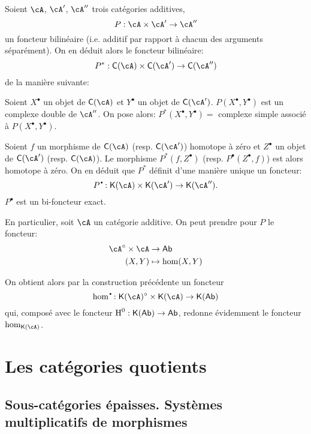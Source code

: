 Soient $\cA$, $\cA'$, $\cA''$ trois cat\'egories additives, 
\[
  P:\cA\times \cA'\to \cA''
\]
un foncteur bilin\'eaire (i.e. additif par rapport \`a chacun des arguments 
s\'epar\'ement). On en d\'eduit alors le foncteur bilin\'eaire: 
\[
  P^\ast:\eC(\cA)\times \eC(\cA') \to \eC(\cA'') 
\]
de la mani\`ere suivante: 

Soient $X^\bullet$ un objet de $\eC(\cA)$ et $Y^\bullet$ un objet de 
$\eC(\cA')$. $P(X^\bullet,Y^\bullet)$ est un complexe double de $\cA''$. On 
pose alors: $P^\ast(X^\bullet,Y^\bullet) = $ complexe simple associ\'e \`a 
$P(X^\bullet,Y^\bullet)$. 

Soient $f$ un morphisme de $\eC(\cA)$ (resp. $\eC(\cA')$) homotope \`a z\'ero 
et $Z^\bullet$ un objet de $\eC(\cA')$ (resp. $\eC(\cA)$). Le morphisme 
$P^\ast(f,Z^\bullet)$ (resp. $P^\bullet(Z^\bullet,f)$) est alors homotope \`a 
z\'ero. On en d\'eduit que $P^\ast$ d\'efinit d'une mani\`ere unique un 
foncteur: 
\[
  P^\bullet:\eK(\cA) \times \eK(\cA') \to \eK(\cA'') \text{.}
\]
$P^\bullet$ est un bi-foncteur exact. 

En particulier, soit $\cA$ un cat\'egorie additive. On peut prendre pour $P$ le 
foncteur: 
\begin{align*}
  \cA^\circ\times \cA &\to \mathsf{Ab} \\
  (X,Y) &\mapsto \hom(X,Y) 
\end{align*}

On obtient alors par la construction pr\'ec\'edente un foncteur 
\[
  \hom^\bullet:\eK(\cA)^\circ \times \eK(\cA) \to \eK(\mathsf{Ab}) 
\]
qui, compos\'e avec le foncteur $\operatorname{H}^0:\mathsf{K}(\mathsf{Ab})\to \mathsf{Ab}$, 
redonne \'evidemment le foncteur $\hom_{\eK(\cA)}$. 




















\section{Les cat\'egories quotients}\label{VIII:2}










\subsection{Sous-cat\'egories \'epaisses. Syst\`emes multiplicatifs de morphismes}\label{VIII:2-1}

